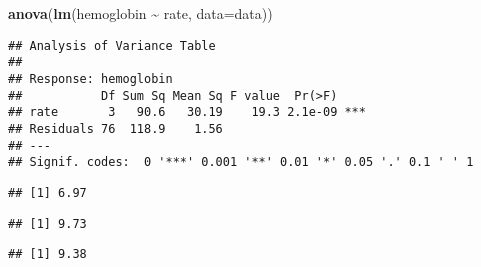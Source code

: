 \documentclass[
]{article}
\newenvironment{Shaded}{\begin{snugshade}}{\end{snugshade}}
\newcommand{\AttributeTok}[1]{\textcolor[rgb]{0.13,0.29,0.53}{#1}}
\newcommand{\DecValTok}[1]{\textcolor[rgb]{0.00,0.00,0.81}{#1}}
\newcommand{\FunctionTok}[1]{\textcolor[rgb]{0.13,0.29,0.53}{\textbf{#1}}}
\newcommand{\NormalTok}[1]{#1}
\newcommand{\SpecialCharTok}[1]{\textcolor[rgb]{0.81,0.36,0.00}{\textbf{#1}}}
\begin{document}
\begin{Shaded}
\begin{Highlighting}[]
\FunctionTok{anova}\NormalTok{(}\FunctionTok{lm}\NormalTok{(hemoglobin }\SpecialCharTok{\textasciitilde{}}\NormalTok{ rate, }\AttributeTok{data=}\NormalTok{data))}
\end{Highlighting}
\end{Shaded}

\begin{verbatim}
## Analysis of Variance Table
## 
## Response: hemoglobin
##           Df Sum Sq Mean Sq F value  Pr(>F)    
## rate       3   90.6   30.19    19.3 2.1e-09 ***
## Residuals 76  118.9    1.56                    
## ---
## Signif. codes:  0 '***' 0.001 '**' 0.01 '*' 0.05 '.' 0.1 ' ' 1
\end{verbatim}

\begin{Shaded}
\end{Shaded}

\begin{verbatim}
## [1] 6.97
\end{verbatim}

\begin{Shaded}
\end{Shaded}

\begin{verbatim}
## [1] 9.73
\end{verbatim}

\begin{Shaded}
\end{Shaded}

\begin{verbatim}
## [1] 9.38
\end{verbatim}
\end{document}
